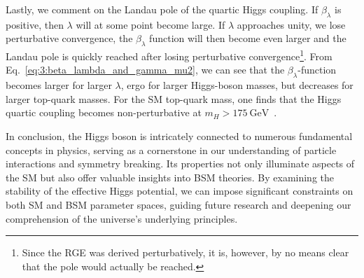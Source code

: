 Lastly, we comment on the Landau pole of the quartic Higgs coupling. If $\beta_\lambda$ is positive, then $\lambda$ will at some point become large. If $\lambda$ approaches unity, we lose perturbative convergence, the $\beta_\lambda$ function will then become even larger and the Landau pole is quickly reached after losing perturbative convergence\footnote{Since the \acs{RGE} was derived perturbatively, it is, however, by no means clear that the pole would actually be reached.}. From  Eq.~\eqref{eq:3:beta_lambda_and_gamma_mu2}, we can see that the $\beta_\lambda$-function becomes larger for larger $\lambda$, ergo for larger Higgs-boson masses, but decreases for larger top-quark masses. For the \acs{SM} top-quark mass, one finds that the Higgs quartic coupling becomes non-perturbative at $m_H > 175\ \mathrm{GeV}$~\cite{Degrassi:2012ry}.

In conclusion, the Higgs boson is intricately connected to numerous fundamental concepts in physics, serving as a cornerstone in our understanding of particle interactions and symmetry breaking. Its properties not only illuminate aspects of the \acs{SM} but also offer valuable insights into \acs{BSM} theories. By examining the stability of the effective Higgs potential, we can impose significant constraints on both \acs{SM} and \acs{BSM} parameter spaces, guiding future research and deepening our comprehension of the universe's underlying principles.

